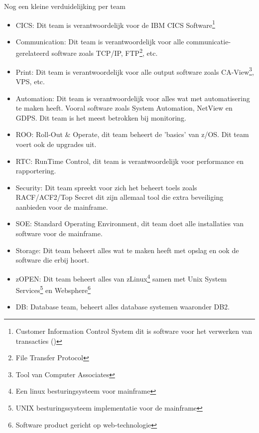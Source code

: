 Nog een kleine verduidelijking per team
\begin{itemize}
	\item CICS: Dit team is verantwoordelijk voor de IBM CICS Software\footnote{Customer Information Control System dit is software voor het verwerken van transacties (\cite{ChrisRayns2011}) }
	\item Communication: Dit team is verantwoordelijk voor alle communicatie-gerelateerd software zoals TCP/IP, FTP\footnote{File Transfer Protocol}, etc.
	\item Print: Dit team is verantwoordelijk voor alle output software zoals CA-View\footnote{Tool van Computer Associates}, VPS, etc.
	\item Automation: Dit team is verantwoordelijk voor alles wat met automatisering te maken heeft. Vooral software zoals System Automation, NetView en GDPS. Dit team is het meest betrokken bij monitoring.
	\item ROO: Roll-Out \& Operate, dit team beheert de 'basics' van z/OS. Dit team voert ook de upgrades uit.
	\item RTC: RunTime Control, dit team is verantwoordelijk voor performance en rapportering.
	\item Security: Dit team spreekt voor zich het beheert toels zoals RACF/ACF2/Top Secret dit zijn allemaal tool die extra beveiliging aanbieden voor de mainframe.	
	\item SOE: Standard Operating Environment, dit team doet alle installaties van software voor de mainframe.
	\item Storage: Dit team beheert alles wat te maken heeft met opslag en ook de software die erbij hoort.
	\item zOPEN: Dit team beheert alles van zLinux\footnote{Een linux besturingsysteem voor mainframe} samen met Unix System Services\footnote{UNIX besturingssysteem implementatie voor de mainframe} en Websphere\footnote{Software product gericht op web-technologie}
	\item DB: Database team, beheert alles database systemen waaronder DB2.
\end{itemize}

